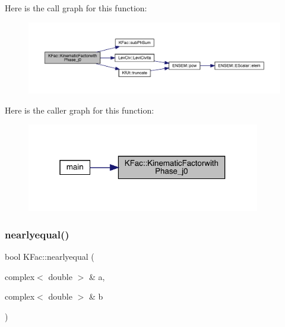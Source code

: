 Here is the call graph for this function\+:\nopagebreak
\begin{figure}[H]
\begin{center}
\leavevmode
\includegraphics[width=350pt]{d2/d89/namespaceKFac_a87a5304db9d4c659637da23e363cf4a4_cgraph}
\end{center}
\end{figure}
Here is the caller graph for this function\+:\nopagebreak
\begin{figure}[H]
\begin{center}
\leavevmode
\includegraphics[width=289pt]{d2/d89/namespaceKFac_a87a5304db9d4c659637da23e363cf4a4_icgraph}
\end{center}
\end{figure}
\mbox{\label{namespaceKFac_a07acf360038cc03b8c6bd73f6724a7f5}} 
\subsubsection{\texorpdfstring{nearlyequal()}{nearlyequal()}}
{\footnotesize\ttfamily bool K\+Fac\+::nearlyequal (\begin{DoxyParamCaption}\item[{complex$<$ double $>$ \&}]{a,  }\item[{complex$<$ double $>$ \&}]{b }\end{DoxyParamCaption})}

\mbox{\label{namespaceKFac_a87e82af0cfc26fdde23953fb315dc9d5}} 
